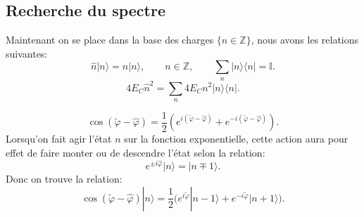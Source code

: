 \subsection{Recherche du spectre}

Maintenant on se place dans la base des charges $\{n\in\mathbb{Z}\}$, nous avons les relations suivantes:
\begin{equation}
\hat{n}|n\rangle = n|n\rangle, \qquad n\in\mathbb{Z}, \qquad 
\sum_n |n\rangle\langle n| = \mathbb{I}.
\label{sec:n}
\end{equation}
\begin{equation}
4E_C\hat{n}^2 = \sum_n 4E_C n^2 |n\rangle\langle n|.
\end{equation}

\begin{equation}
\cos(\tilde{\varphi}-\hat{\varphi})
= \frac12 \left(
e^{i(\tilde{\varphi}-\hat{\varphi})}
+ e^{-i(\tilde{\varphi}-\hat{\varphi})}
\right).
\end{equation}
Lorsqu'on fait agir l'état $n$ sur la fonction exponentielle, cette action aura pour effet de faire monter ou de descendre l'état selon la relation:
\begin{equation}
e^{\pm i\hat{\varphi}} |n\rangle = |n\mp1\rangle.
\label{eq:m}
\end{equation}
Donc on trouve la relation:
\begin{equation}
\cos(\tilde{\varphi}-\hat{\varphi})|n\rangle
= \frac12\Big(
e^{i\tilde{\varphi}}|n-1\rangle
+ e^{-i\tilde{\varphi}}|n+1\rangle
\Big).
\end{equation}

